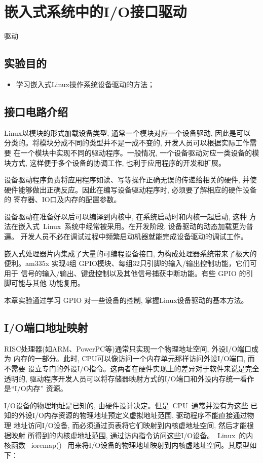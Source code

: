 \chapter{嵌入式系统中的I/O接口驱动}{驱动}

\section{实验目的}
\begin{itemize}
  \item 学习嵌入式Linux操作系统设备驱动的方法；
\end{itemize}

\section{接口电路介绍}
	Linux以模块的形式加载设备类型, 通常一个模块对应一个设备驱动, 因此是可以
分类的。将模块分成不同的类型并不是一成不变的, 开发人员可以根据实际工作需要
在一个模块中实现不同的驱动程序。一般情况, 一个设备驱动对应一类设备的模块方式, 
这样便于多个设备的协调工作, 也利于应用程序的开发和扩展。

	设备驱动程序负责将应用程序如读、写等操作正确无误的传递给相关的硬件, 并使
硬件能够做出正确反应。因此在编写设备驱动程序时, 必须要了解相应的硬件设备的
寄存器、IO口及内存的配置参数。

	设备驱动在准备好以后可以编译到内核中, 在系统启动时和内核一起启动, 这种
方法在嵌入式~Linux~系统中经常被采用。在开发阶段, 设备驱动的动态加载更为普遍。
开发人员不必在调试过程中频繁启动机器就能完成设备驱动的调试工作。

	嵌入式处理器片内集成了大量的可编程设备接口, 为构成处理器系统带来了极大的
便利。am335x 实现4组 GPIO模块、每组32只引脚的输入/输出控制功能，它们可用于
信号的输入/输出、键盘控制以及其他信号捕获中断功能。有些 GPIO 的引脚可能与其他
功能复用。

	本章实验通过学习 GPIO 对一些设备的控制, 掌握Linux设备驱动的基本方法。

\section{I/O端口地址映射}
	RISC处理器(如ARM、PowerPC等)通常只实现一个物理地址空间, 外设I/O端口成为
内存的一部分。此时, CPU可以像访问一个内存单元那样访问外设I/O端口, 而不需要
设立专门的外设I/O指令。这两者在硬件实现上的差异对于软件来说是完全透明的, 
驱动程序开发人员可以将存储器映射方式的I/O端口和外设内存统一看作是``I/O内存''
资源。

	I/O设备的物理地址是已知的, 由硬件设计决定。但是~CPU~通常并没有为这些
已知的外设I/O内存资源的物理地址预定义虚拟地址范围, 驱动程序不能直接通过物理
地址访问I/O设备, 而必须通过页表将它们映射到内核虚地址空间, 然后才能根据映射
所得到的内核虚地址范围, 通过访内指令访问这些I/O设备。~Linux~的内核函数
~ioremap()~ 用来将I/O设备的物理地址映射到内核虚地址空间。其原型如下：

